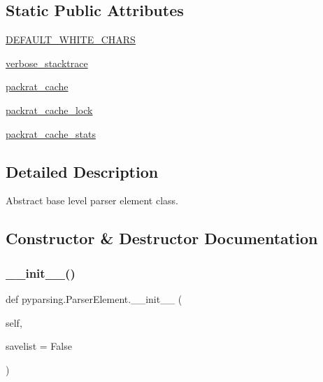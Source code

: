 \subsection*{Static Public Attributes}
\begin{DoxyCompactItemize}
\item 
\hyperlink{classpyparsing_1_1ParserElement_a36e953eaa7d08c4cb112672fe9c05f2e}{D\+E\+F\+A\+U\+L\+T\+\_\+\+W\+H\+I\+T\+E\+\_\+\+C\+H\+A\+RS}
\item 
\hyperlink{classpyparsing_1_1ParserElement_a12cce1673b4720da6ca42e8acf5395da}{verbose\+\_\+stacktrace}
\item 
\hyperlink{classpyparsing_1_1ParserElement_ab2c6a1d4deffe155001c06cbffb98a31}{packrat\+\_\+cache}
\item 
\hyperlink{classpyparsing_1_1ParserElement_aa36b8eb00b36fd0cb08ad1d7dc19a1eb}{packrat\+\_\+cache\+\_\+lock}
\item 
\hyperlink{classpyparsing_1_1ParserElement_ab5ee6a77bdb23146b3100257eaffcb8a}{packrat\+\_\+cache\+\_\+stats}
\end{DoxyCompactItemize}


\subsection{Detailed Description}
\begin{DoxyVerb}Abstract base level parser element class.\end{DoxyVerb}
 

\subsection{Constructor \& Destructor Documentation}
\mbox{\label{classpyparsing_1_1ParserElement_af2b1ea2e6dddf5043eb401bfaf114463}} 
\subsubsection{\texorpdfstring{\+\_\+\+\_\+init\+\_\+\+\_\+()}{\_\_init\_\_()}}
{\footnotesize\ttfamily def pyparsing.\+Parser\+Element.\+\_\+\+\_\+init\+\_\+\+\_\+ (\begin{DoxyParamCaption}\item[{}]{self,  }\item[{}]{savelist = {\ttfamily False} }\end{DoxyParamCaption})}



